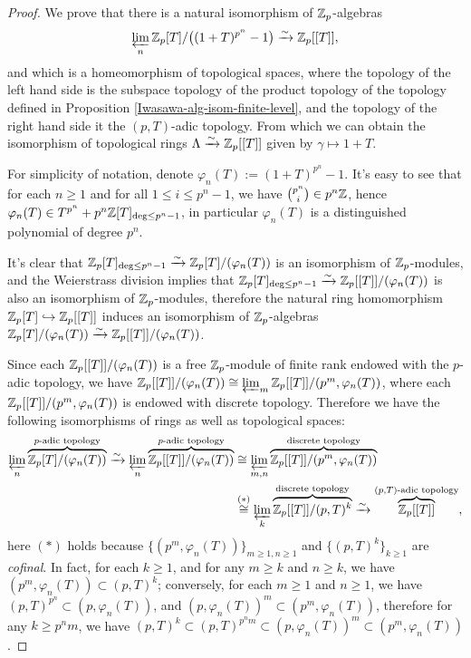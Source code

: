 \begin{proof}
We prove that there is a natural isomorphism of ${\mathbb {Z}}_p$-algebras
$$
\varprojlim_n{\mathbb {Z}}_p[T]/\big((1+T)^{p^n}-1\big)
\xrightarrow\sim{\mathbb {Z}}_p[[T]],
$$
and which is a homeomorphism of topological spaces,
where the topology of the left hand side is the subspace topology
of the product topology of the topology defined in Proposition
\ref{Iwasawa-alg-isom-finite-level},
and the topology of the right hand side it the $(p,T)$-adic topology.
From which we can obtain the isomorphism of topological rings
$\Lambda\xrightarrow\sim{\mathbb {Z}}_p[[T]]$ given by $\gamma\mapsto 1+T$.

For simplicity of notation, denote $\varphi_n(T):=(1+T)^{p^n}-1$.
It's easy to see that for each $n\geq 1$ and for all $1\leq i\leq p^n-1$,
we have $\binom{p^n}{i}\in p^n{\mathbb {Z}}$,
hence $\varphi_n(T)\in T^{p^n}+p^n{\mathbb {Z}}[T]_{\deg\leq p^n-1}$,
in particular $\varphi_n(T)$ is a distinguished polynomial of degree $p^n$.

It's clear that ${\mathbb {Z}}_p[T]_{\deg\leq p^n-1}\xrightarrow\sim{\mathbb {Z}}_p[T]/(\varphi_n(T))$
is an isomorphism of ${\mathbb {Z}}_p$-modules,
and the Weierstrass division implies that
${\mathbb {Z}}_p[T]_{\deg\leq p^n-1}\xrightarrow\sim{\mathbb {Z}}_p[[T]]/(\varphi_n(T))$
is also an isomorphism of ${\mathbb {Z}}_p$-modules,
therefore the natural ring homomorphism ${\mathbb {Z}}_p[T]\hookrightarrow{\mathbb {Z}}_p[[T]]$
induces an isomorphism of ${\mathbb {Z}}_p$-algebras
${\mathbb {Z}}_p[T]/(\varphi_n(T))\xrightarrow\sim{\mathbb {Z}}_p[[T]]/(\varphi_n(T))$.

Since each ${\mathbb {Z}}_p[[T]]/(\varphi_n(T))$ is a free ${\mathbb {Z}}_p$-module of finite rank
endowed with the $p$-adic topology, we have
${\mathbb {Z}}_p[[T]]/(\varphi_n(T))\cong\varprojlim_m{\mathbb {Z}}_p[[T]]/(p^m,\varphi_n(T))$,
where each ${\mathbb {Z}}_p[[T]]/(p^m,\varphi_n(T))$ is endowed with discrete topology.
Therefore we have the following isomorphisms of rings as well as topological spaces:
\begin{align*}
\varprojlim_n\overbrace{{\mathbb {Z}}_p[T]/(\varphi_n(T))}^{p\text{-adic topology}}
\xrightarrow\sim
\varprojlim_n\overbrace{{\mathbb {Z}}_p[[T]]/(\varphi_n(T))}^{p\text{-adic topology}}
&\cong
\varprojlim_{m,n}\overbrace{{\mathbb {Z}}_p[[T]]/(p^m,\varphi_n(T))}^{\text{discrete topology}} \\
&\stackrel{(*)}\cong
\varprojlim_k\overbrace{{\mathbb {Z}}_p[[T]]/(p,T)^k}^{\text{discrete topology}}
\xrightarrow\sim
\overbrace{{\mathbb {Z}}_p[[T]]}^{(p,T)\text{-adic topology}},
\end{align*}
here $(*)$ holds because $\{(p^m,\varphi_n(T))\}_{m\geq 1,n\geq 1}$
and $\{(p,T)^k\}_{k\geq 1}$ are \emph{cofinal}.
In fact, for each $k\geq 1$, and for any $m\geq k$ and $n\geq k$,
we have $(p^m,\varphi_n(T))\subset(p,T)^k$;
conversely, for each $m\geq 1$ and $n\geq 1$,
we have $(p,T)^{p^n}\subset(p,\varphi_n(T))$,
and $(p,\varphi_n(T))^m\subset(p^m,\varphi_n(T))$,
therefore for any $k\geq p^nm$, we have
$(p,T)^k\subset(p,T)^{p^nm}\subset(p,\varphi_n(T))^m\subset(p^m,\varphi_n(T))$.
\end{proof}

